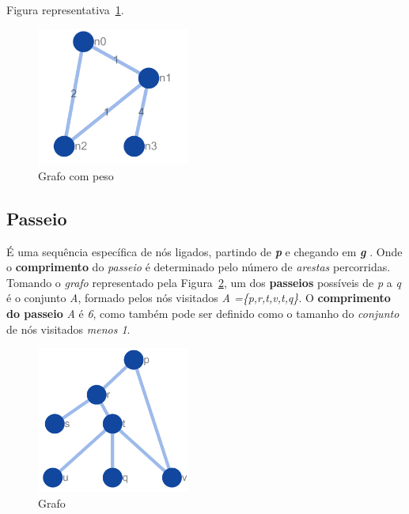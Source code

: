 Figura representativa~\ref{graph_wheigth}.
%
\begin{figure}[ht!]
\centering
\includegraphics[width=50mm]{Images/graph_wheigth.png}
\caption {Grafo com peso
\label{graph_wheigth}}
\end{figure}

\subsection{Passeio}
É uma sequência específica de nós ligados, partindo de \textbf{\textit{p}} e chegando em \textbf{\textit{g}} \cite{Pavlopoulos2011}. Onde o \textbf{comprimento} do \textit{passeio} é determinado pelo número de \textit{arestas} percorridas.
%
Tomando o \textsl{grafo} representado pela Figura~\ref{graph_path}, um dos \textbf{passeios} possíveis de \textsl{p} a \textsl{q} é o conjunto \textsl{A}, formado pelos nós visitados \textit{A =\{p,r,t,v,t,q\}}. O \textbf{comprimento do passeio} \textsl{A} é \textit{6}, como também pode ser definido como o tamanho do \textit{conjunto} de nós visitados \textit{menos 1}.
%
\begin{figure}[ht!]
\centering
\includegraphics[width=50mm]{Images/graph_path.png}
\caption {Grafo
\label{graph_path}}
\end{figure}



